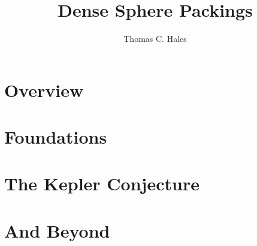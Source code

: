 \documentclass[spanningrule]{cambridge7A}
\def\lll{\resetlinenumber[1]}
\def\linput#1{\lll}
\theoremstyle{plain}
\theoremstyle{definition}
\theoremstyle{remark}
\begin{document}
\title[a blueprint for formal proofs]
    {%
      Dense Sphere Packings}
\author{Thomas C. Hales}


%
    
    \frontmatter
    \maketitle
    \tableofcontents


   \newpage
   
 
  \mainmatter
  
    \part{Overview}
    
    
    
    \part{Foundations}
    \linput{trig}  
    \linput{volume}
    \linput{hypermap}
    \linput{fan}

    

    \part{The Kepler Conjecture}
    
    \linput{packing}
    \linput{local}
    \linput{tame}

    
    \part{And Beyond}
    \linput{further}
    
    \appendix
    \newpage
    
    
    


\raggedright






\end{document}
